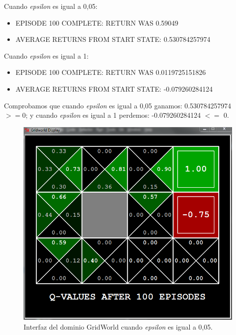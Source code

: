 \documentclass[11pt]{exam}
\begin{document}
\begin{questions}

Cuando \textit{epsilon} es igual a 0,05:
\begin{itemize}
	\item EPISODE 100 COMPLETE: RETURN WAS 0.59049
	\item AVERAGE RETURNS FROM START STATE: 0.530784257974
\end{itemize}

Cuando \textit{epsilon} es igual a 1:
\begin{itemize}
	\item EPISODE 100 COMPLETE: RETURN WAS 0.0119725151826
	\item AVERAGE RETURNS FROM START STATE: -0.079260284124
\end{itemize}	

Comprobamos que cuando \textit{epsilon} es igual a 0,05 ganamos: 0.530784257974 $>= 0$; y cuando \textit{epsilon} es igual a 1 perdemos: -0.079260284124 $<=$ 0.

\begin{figure}[h]
	\centering
	\includegraphics[scale=0.5]{image_4}
	\caption{Interfaz del dominio GridWorld cuando \textit{epsilon} es igual a 0,05.}
	\label{image_4}
\end{figure}


\end{questions}
\end{document}
